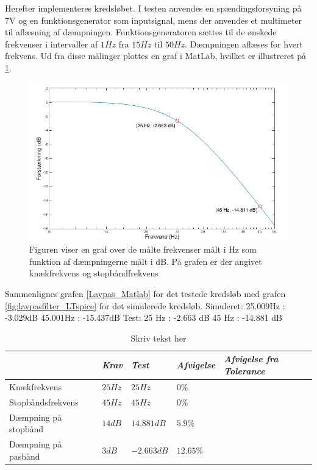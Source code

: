 Herefter implementeres kredsløbet. I testen anvendes en spændingsforsyning på 7V og en funktionsgenerator som inputsignal, mens der anvendes et multimeter til aflæsning af dæmpningen. Funktionsgeneratoren sættes til de ønskede frekvenser i intervaller af $1Hz$ fra $15Hz$ til $50Hz$. Dæmpningen aflæses for hvert frekvens. Ud fra disse målinger plottes en graf i MatLab, hvilket er illustreret på \ref{fig:Lavpas_Matlab}.  

\begin{figure}[H]
	\centering
	\includegraphics[scale=0.4]{figures/cProblemloesning/Lavpas_Matlab.PNG}
	\caption{Figuren viser en graf over de målte frekvenser målt i Hz som funktion af dæmpningerne målt i dB. På grafen er der angivet knækfrekvens og stopbåndfrekvens}
	\label{fig:Lavpas_Matlab}
\end{figure}

Sammenlignes grafen \ref{Lavpas_Matlab} for det testede kredsløb med grafen \ref{fig:lavpasfilter_LTspice} for det simulerede kredsløb. 
Simuleret:
25.009Hz : -3.029dB
45.001Hz : -15.437dB
Test:
25 Hz    : -2.663 dB
45 Hz    : -14.881 dB


\begin{table}[H]
	\centering
	\begin{tabular}{|l|l|l|l|l|}
		\hline
        & \textit{Krav} 			& \textit{Test}  &\textit{Afvigelse} 	&  \textit{Afvigelse fra Tolerance} \\ \hline
Knækfrekvens	 & $25Hz$ 			& $25Hz$			& $0\%$ &  \\ \hline
Stopbåndsfrekvens & $45Hz$		& $45Hz$			& $0\%$ & \\ \hline
Dæmpning på stopbånd & $14dB$    & $14.881dB$    & $5.9\%$  & \\ \hline
Dæmpning på pasbånd & $3dB$		& $-2.663dB$	    & $12.65\%$ & \\ \hline
	\end{tabular}
	\caption{Skriv tekst her}
	\label{Tab:Tolerance}
\end{table}